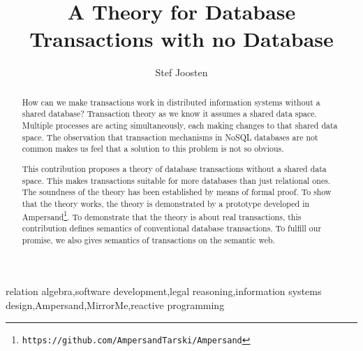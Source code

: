 \documentclass{elsarticle}
\begin{document}
\title{A Theory for Database Transactions with no Database}
\author[ou,ordina]{Stef Joosten}
\address[ou]{Open Universiteit Nederland, Postbus 2960, 6401 DL Heerlen, the Netherlands}
\address[ordina]{Ordina NV, Nieuwegein, the Netherlands}

\begin{abstract}
	How can we make transactions work in distributed information systems without a shared database?
	Transaction theory as we know it assumes a shared data space.
	Multiple processes are acting simultaneously, each making changes to that shared data space.
	The observation that transaction mechanisms in NoSQL databases are not common
	makes us feel that a solution to this problem is not so obvious.

	This contribution proposes a theory of database transactions without a shared data space.
	This makes transactions suitable for more databases than just relational ones.
	The soundness of the theory has been established by means of formal proof.
	To show that the theory works, the theory is demonstrated by a prototype developed in Ampersand\footnote{\tt https://github.com/AmpersandTarski/Ampersand}.
	To demonstrate that the theory is about real transactions, this contribution defines semantics of conventional database transactions.
	To fulfill our promise, we also gives semantics of transactions on the semantic web.
\end{abstract}

\begin{keyword}
relation algebra\sep software development\sep legal reasoning\sep information systems design\sep Ampersand\sep MirrorMe\sep reactive programming
\end{keyword}
\maketitle
\end{document}
